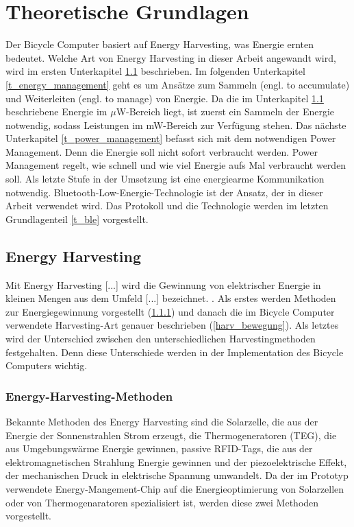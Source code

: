 \chapter{Theoretische Grundlagen}

Der Bicycle Computer basiert auf Energy Harvesting, was Energie ernten bedeutet. Welche Art von Energy Harvesting in dieser Arbeit angewandt wird, wird im ersten Unterkapitel \ref{t_harvesting} beschrieben. Im folgenden Unterkapitel \ref{t_energy_management} geht es um Ansätze zum Sammeln (engl. to accumulate) und Weiterleiten (engl. to manage) von Energie. Da die im Unterkapitel \ref{t_harvesting} beschriebene Energie im $\mu$W-Bereich liegt, ist zuerst ein Sammeln der Energie notwendig, sodass Leistungen im mW-Bereich zur Verfügung stehen. Das nächste Unterkapitel \ref{t_power_management} befasst sich mit dem notwendigen Power Management. Denn die
Energie soll nicht sofort verbraucht werden. Power Management regelt, wie schnell und wie viel Energie aufs Mal verbraucht werden soll. Als letzte Stufe in der Umsetzung ist eine energiearme Kommunikation notwendig. Bluetooth-Low-Energie-Technologie ist der Ansatz, der in dieser Arbeit verwendet wird. Das Protokoll und die Technologie werden im letzten Grundlagenteil \ref{t_ble} vorgestellt.


\section{Energy Harvesting}\label{t_harvesting} 

\glqq Mit Energy Harvesting [...] wird die Gewinnung von elektrischer Energie in kleinen Mengen aus dem Umfeld [...] bezeichnet.\grqq {} \cite{harvesting}. Als erstes werden Methoden zur Energiegewinnung vorgestellt (\ref{harv_arten}) und danach die im Bicycle Computer verwendete Harvesting-Art genauer beschrieben (\ref{harv_bewegung}). Als letztes wird der Unterschied zwischen den unterschiedlichen Harvestingmethoden festgehalten. Denn diese Unterschiede werden in der Implementation des Bicycle Computers wichtig.


\subsection{Energy-Harvesting-Methoden}\label{harv_arten} 

Bekannte Methoden des Energy Harvesting sind die Solarzelle, die aus der Energie der Sonnenstrahlen Strom erzeugt, die Thermogeneratoren (TEG), die aus Umgebungswärme Energie gewinnen,  passive RFID-Tags, die aus der elektromagnetischen Strahlung Energie gewinnen und der piezoelektrische Effekt, der mechanischen Druck in elektrische Spannung umwandelt. Da der im Prototyp verwendete Energy-Mangement-Chip \cite{datasheet_EM85} auf die Energieoptimierung von Solarzellen oder von Thermogenaratoren spezialisiert ist, werden diese zwei Methoden vorgestellt. 


